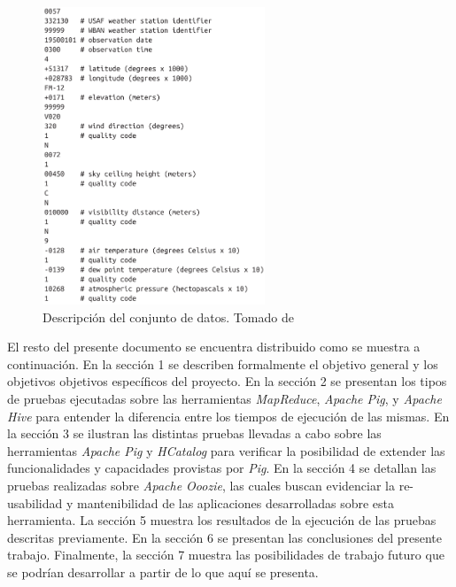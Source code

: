 \begin{figure}[H]
\label{dataset}
  \centering
      \includegraphics[width=\textwidth, height=3.5in]{fig/dataset}
  \caption{Descripción del conjunto de datos. Tomado de \cite{White:2012:HDG:2285539}}
\end{figure}

El resto del presente documento se encuentra distribuido como se muestra a continuación. En la sección 1 se describen formalmente el objetivo general y los objetivos objetivos específicos del proyecto. En la sección 2 se presentan los tipos de pruebas ejecutadas sobre las herramientas \textit{MapReduce}, \textit{Apache Pig}, y \textit{Apache Hive} para entender la diferencia entre los tiempos de ejecución de las mismas. En la sección 3 se ilustran las distintas pruebas llevadas a cabo sobre las herramientas \textit{Apache Pig} y \textit{HCatalog} para verificar la posibilidad de extender las funcionalidades y capacidades provistas por \textit{Pig}. En la sección 4 se detallan las pruebas realizadas sobre \textit{Apache Ooozie}, las cuales buscan evidenciar la re-usabilidad y mantenibilidad de las aplicaciones desarrolladas sobre esta herramienta. La sección 5 muestra los resultados de la ejecución de las pruebas descritas previamente. En la sección 6 se presentan las conclusiones del presente trabajo. Finalmente, la sección 7 muestra las posibilidades de trabajo futuro que se podrían desarrollar a partir de lo que aquí se presenta.